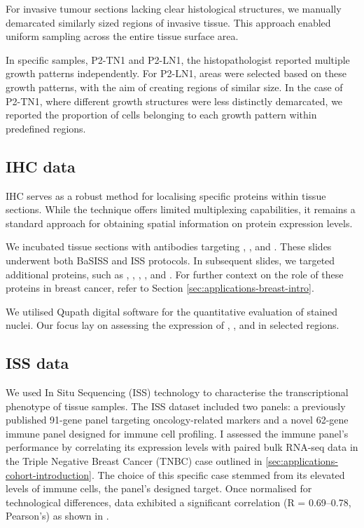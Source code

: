 For invasive tumour sections lacking clear histological structures, we manually demarcated similarly sized regions of invasive tissue. This approach enabled uniform sampling across the entire tissue surface area.

In specific samples, P2-TN1 and P2-LN1, the histopathologist reported multiple growth patterns independently. For P2-LN1, areas were selected based on these growth patterns, with the aim of creating regions of similar size. In the case of P2-TN1, where different growth structures were less distinctly demarcated, we reported the proportion of cells belonging to each growth pattern within predefined regions.

\subsection{\acl{IHC} data}

\acl{IHC} serves as a robust method for localising specific proteins within tissue sections. While the technique offers limited multiplexing capabilities, it remains a standard approach for obtaining spatial information on protein expression levels.

We incubated tissue sections with antibodies targeting , , and . These slides underwent both BaSISS and ISS protocols. In subsequent slides, we targeted additional proteins, such as , , , , and . For further context on the role of these proteins in breast cancer, refer to Section \cref{sec:applications-breast-intro}.

We utilised Qupath digital software for the quantitative evaluation of stained nuclei. Our focus lay on assessing the expression of , , and  in selected regions.

\subsection{\acl{ISS} data}

We used In Situ Sequencing (\ac{ISS}) technology to characterise the transcriptional phenotype of tissue samples. The \ac{ISS} dataset included two panels: a previously published 91-gene panel targeting oncology-related markers and a novel 62-gene immune panel designed for immune cell profiling. I assessed the immune panel's performance by correlating its expression levels with paired bulk RNA-seq data in the Triple Negative Breast Cancer (TNBC) case outlined in \cref{sec:applications-cohort-introduction}. The choice of this specific case stemmed from its elevated levels of immune cells, the panel's designed target. Once normalised for technological differences, data exhibited a significant correlation (R = 0.69–0.78, Pearson's) as shown in .

